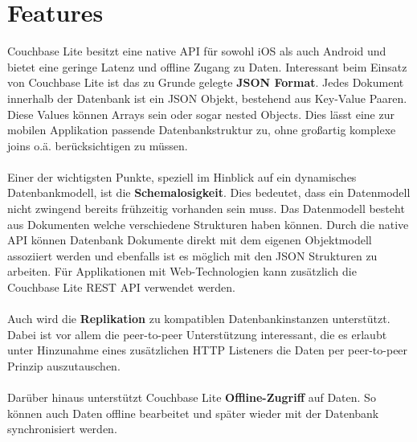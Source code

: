 \documentclass[a4paper,14pt]{scrreprt}
\begin{document}
\section{Features}
Couchbase Lite besitzt eine native API für sowohl iOS als auch Android und bietet eine geringe Latenz und offline Zugang zu Daten. Interessant beim Einsatz von Couchbase Lite ist das zu Grunde gelegte \textbf{JSON Format}. Jedes Dokument innerhalb der Datenbank ist ein JSON Objekt, bestehend aus Key-Value Paaren. Diese Values können Arrays sein oder sogar nested Objects. Dies lässt eine zur mobilen Applikation passende Datenbankstruktur zu, ohne großartig komplexe joins o.ä. berücksichtigen zu müssen. \\\\Einer der wichtigsten Punkte, speziell im Hinblick auf ein dynamisches Datenbankmodell, ist die \textbf{Schemalosigkeit}. Dies bedeutet, dass ein Datenmodell nicht zwingend bereits frühzeitig vorhanden sein muss. Das Datenmodell besteht aus Dokumenten welche verschiedene Strukturen haben können. Durch die native API können Datenbank Dokumente direkt mit dem eigenen Objektmodell assoziiert werden und ebenfalls ist es möglich mit den JSON Strukturen zu arbeiten. Für Applikationen mit Web-Technologien kann zusätzlich die Couchbase Lite REST API verwendet werden.\\\\Auch wird die \textbf{Replikation} zu kompatiblen Datenbankinstanzen unterstützt. Dabei ist vor allem die peer-to-peer Unterstützung interessant, die es erlaubt unter Hinzunahme eines zusätzlichen HTTP Listeners die Daten per peer-to-peer Prinzip auszutauschen.\\\\Darüber hinaus unterstützt Couchbase Lite \textbf{Offline-Zugriff} auf Daten. So können auch Daten offline bearbeitet und später wieder mit der Datenbank synchronisiert werden.\cite{couch1}
\end{document}
